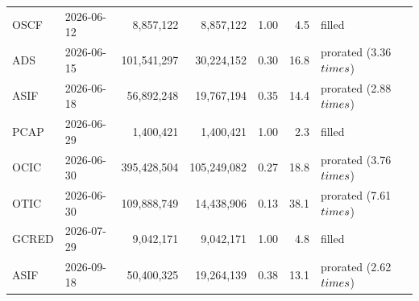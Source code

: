 \documentclass[12pt]{standalone}
\begin{document}
\begin{tabular}{llrrrrl}
OSCF & 2026-06-12 & 8,857,122 & 8,857,122 & 1.00 & 4.5 & filled \\
ADS & 2026-06-15 & 101,541,297 & 30,224,152 & 0.30 & 16.8 & prorated (3.36$\\times$) \\
ASIF & 2026-06-18 & 56,892,248 & 19,767,194 & 0.35 & 14.4 & prorated (2.88$\\times$) \\
PCAP & 2026-06-29 & 1,400,421 & 1,400,421 & 1.00 & 2.3 & filled \\
OCIC & 2026-06-30 & 395,428,504 & 105,249,082 & 0.27 & 18.8 & prorated (3.76$\\times$) \\
OTIC & 2026-06-30 & 109,888,749 & 14,438,906 & 0.13 & 38.1 & prorated (7.61$\\times$) \\
GCRED & 2026-07-29 & 9,042,171 & 9,042,171 & 1.00 & 4.8 & filled \\
ASIF & 2026-09-18 & 50,400,325 & 19,264,139 & 0.38 & 13.1 & prorated (2.62$\\times$) \\
\bottomrule\end{tabular}
\end{document}
